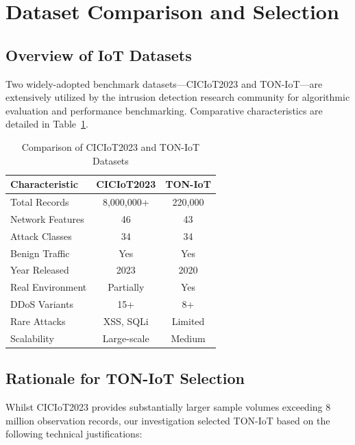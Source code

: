 \documentclass[conference]{IEEEtran}
\begin{document}
\section{Dataset Comparison and Selection}

\subsection{Overview of IoT Datasets}

Two widely-adopted benchmark datasets—CICIoT2023 and TON-IoT—are extensively utilized by the intrusion detection research community for algorithmic evaluation and performance benchmarking. Comparative characteristics are detailed in Table~\ref{tab:dataset_comparison}.

\begin{table}[h]
\caption{Comparison of CICIoT2023 and TON-IoT Datasets}
\label{tab:dataset_comparison}
\centering
\begin{tabular}{|l|c|c|}
\hline
\textbf{Characteristic} & \textbf{CICIoT2023} & \textbf{TON-IoT} \\
\hline
Total Records & 8,000,000+ & 220,000 \\
\hline
Network Features & 46 & 43 \\
\hline
Attack Classes & 34 & 34 \\
\hline
Benign Traffic & Yes & Yes \\
\hline
Year Released & 2023 & 2020 \\
\hline
Real Environment & Partially & Yes \\
\hline
DDoS Variants & 15+ & 8+ \\
\hline
Rare Attacks & XSS, SQLi & Limited \\
\hline
Scalability & Large-scale & Medium \\
\hline
\end{tabular}
\end{table}

\subsection{Rationale for TON-IoT Selection}

Whilst CICIoT2023 provides substantially larger sample volumes exceeding 8 million observation records, our investigation selected TON-IoT based on the following technical justifications:
\end{document}
